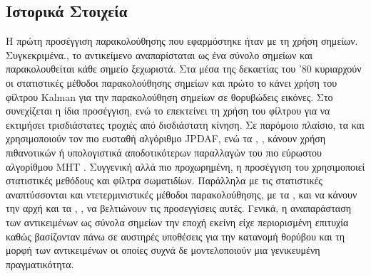 \documentclass[11pt,a4paper,english,greek,twoside]{../Thesis}
\begin{document}
\subsection{Ιστορικά Στοιχεία}
Η πρώτη προσέγγιση παρακολούθησης που εφαρμόστηκε ήταν με τη χρήση σημείων. Συγκεκριμένα., το αντικείμενο αναπαρίσταται ως ένα σύνολο σημείων και παρακολουθείται κάθε σημείο ξεχωριστά. Στα μέσα της δεκαετίας του '80 κυριαρχούν οι στατιστικές μέθοδοι παρακολούθησης σημείων και πρώτο το \cite{broida_1986} κάνει χρήση του φίλτρου Kalman \cite{kalman_1960} για την παρακολούθηση σημείων σε θορυβώδεις εικόνες. Στο \cite{beymer_1999} συνεχίζεται η ίδια προσέγγιση, ενώ το \cite{rosales_1999} επεκτείνει τη χρήση του φίλτρου για να εκτιμήσει τρισδιάστατες τροχιές από δισδιάστατη κίνηση. Σε παρόμοιο πλαίσιο, τα \cite{chang_1991} και \cite{rasmussen_2001} χρησιμοποιούν τον πιο ευσταθή αλγόριθμο JPDAF, ενώ τα \cite{streit_1994}, \cite{cox_1996}, \cite{cham_1999} κάνουν χρήση πιθανοτικών ή υπολογιστικά αποδοτικότερων παραλλαγών του πιο εύρωστου αλγορίθμου MHT \cite{reid_1979}. Συγγενική αλλά πιο προχωρημένη, η προσέγγιση του \cite{hue_2002} χρησιμοποιεί στατιστικές μεθόδους και φίλτρα σωματιδίων. Παράλληλα με τις στατιστικές αναπτύσσονται και ντετερμινιστικές μέθοδοι παρακολούθησης, με τα \cite{sethi_1987}, \cite{salari_1990} και \cite{rangarajan_1991} να κάνουν την αρχή και τα \cite{intille_1997}, \cite{veenman_2001}, \cite{shafique_2003} να βελτιώνουν τις προσεγγίσεις αυτές. Γενικά, η αναπαράσταση των αντικειμένων ως σύνολα σημείων την εποχή εκείνη είχε περιορισμένη επιτυχία καθώς βασίζονταν πάνω σε αυστηρές υποθέσεις για την κατανομή θορύβου και τη μορφή των αντικειμένων οι οποίες συχνά δε μοντελοποιούν μια γενικευμένη πραγματικότητα.
\end{document}
